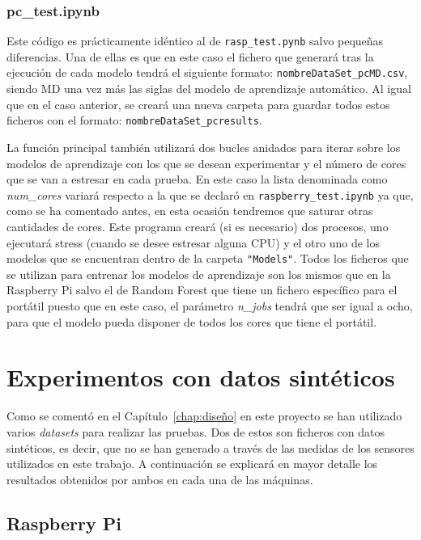 \documentclass[a4paper, 12pt]{book}
\begin{document}
\subsubsection{pc\_test.ipynb}
\label{subsubsec:programa_pruebas_pc}

Este código es prácticamente idéntico al de \texttt{rasp\_test.pynb} salvo pequeñas diferencias. Una de ellas es que en este caso el fichero que generará tras la ejecución de cada modelo tendrá el siguiente formato: \texttt{nombreDataSet\_pcMD.csv}, siendo MD una vez más las siglas del modelo de aprendizaje automático. Al igual que en el caso anterior, se creará una nueva carpeta para guardar todos estos ficheros con el formato: \texttt{nombreDataSet\_pcresults}.

La función principal también utilizará dos bucles anidados para iterar sobre los modelos de aprendizaje con los que se desean experimentar y el número de cores que se van a estresar en cada prueba. En este caso la lista denominada como \textit{num\_cores} variará respecto a la que se declaró en \texttt{raspberry\_test.ipynb} ya que, como se ha comentado antes, en esta ocasión tendremos que saturar otras cantidades de cores. Este programa creará (si es necesario) dos procesos, uno ejecutará stress (cuando se desee estresar alguna CPU) y el otro uno de los modelos que se encuentran dentro de la carpeta \texttt{"Models"}. Todos los ficheros que se utilizan para entrenar los modelos de aprendizaje son los mismos que en la Raspberry Pi salvo el de Random Forest que tiene un fichero específico para el portátil puesto que en este caso, el parámetro \textit{n\_jobs} tendrá que ser igual a ocho, para que el modelo pueda disponer de todos los cores que tiene el portátil. 


\section{Experimentos con datos sintéticos}
\label{sec:exp_dSinteticos}

Como se comentó en el Capítulo~\ref{chap:diseño} en este proyecto se han utilizado varios \textit{datasets} para realizar las pruebas. Dos de estos son ficheros con datos sintéticos, es decir, que no se han generado a través de las medidas de los sensores utilizados en este trabajo. A continuación se explicará en mayor detalle los resultados obtenidos por ambos en cada una de las máquinas.

\subsection{Raspberry Pi}
\label{sub:rasp_sinteticos}
\end{document}
